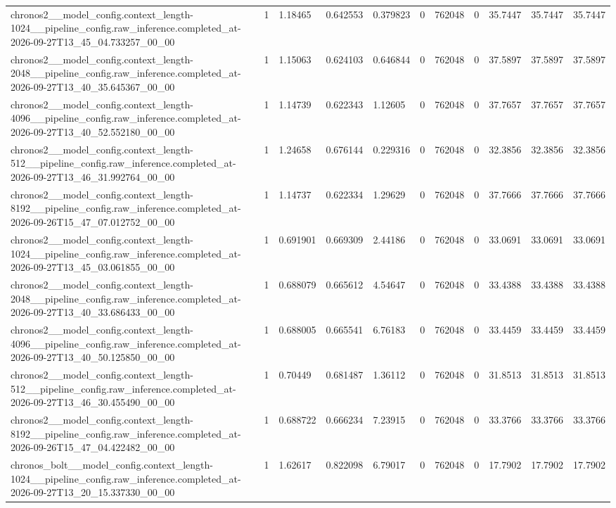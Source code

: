 \begin{tabular}{lllllllllll}
chronos2\_\_model\_config.context\_length-1024\_\_pipeline\_config.raw\_inference.completed\_at-2026-09-27T13\_45\_04.733257\_00\_00 & 1 & 1.18465 & 0.642553 & 0.379823 & 0 & 762048 & 0 & 35.7447 & 35.7447 & 35.7447 \\
chronos2\_\_model\_config.context\_length-2048\_\_pipeline\_config.raw\_inference.completed\_at-2026-09-27T13\_40\_35.645367\_00\_00 & 1 & 1.15063 & 0.624103 & 0.646844 & 0 & 762048 & 0 & 37.5897 & 37.5897 & 37.5897 \\
chronos2\_\_model\_config.context\_length-4096\_\_pipeline\_config.raw\_inference.completed\_at-2026-09-27T13\_40\_52.552180\_00\_00 & 1 & 1.14739 & 0.622343 & 1.12605 & 0 & 762048 & 0 & 37.7657 & 37.7657 & 37.7657 \\
chronos2\_\_model\_config.context\_length-512\_\_pipeline\_config.raw\_inference.completed\_at-2026-09-27T13\_46\_31.992764\_00\_00 & 1 & 1.24658 & 0.676144 & 0.229316 & 0 & 762048 & 0 & 32.3856 & 32.3856 & 32.3856 \\
chronos2\_\_model\_config.context\_length-8192\_\_pipeline\_config.raw\_inference.completed\_at-2026-09-26T15\_47\_07.012752\_00\_00 & 1 & 1.14737 & 0.622334 & 1.29629 & 0 & 762048 & 0 & 37.7666 & 37.7666 & 37.7666 \\
chronos2\_\_model\_config.context\_length-1024\_\_pipeline\_config.raw\_inference.completed\_at-2026-09-27T13\_45\_03.061855\_00\_00 & 1 & 0.691901 & 0.669309 & 2.44186 & 0 & 762048 & 0 & 33.0691 & 33.0691 & 33.0691 \\
chronos2\_\_model\_config.context\_length-2048\_\_pipeline\_config.raw\_inference.completed\_at-2026-09-27T13\_40\_33.686433\_00\_00 & 1 & 0.688079 & 0.665612 & 4.54647 & 0 & 762048 & 0 & 33.4388 & 33.4388 & 33.4388 \\
chronos2\_\_model\_config.context\_length-4096\_\_pipeline\_config.raw\_inference.completed\_at-2026-09-27T13\_40\_50.125850\_00\_00 & 1 & 0.688005 & 0.665541 & 6.76183 & 0 & 762048 & 0 & 33.4459 & 33.4459 & 33.4459 \\
chronos2\_\_model\_config.context\_length-512\_\_pipeline\_config.raw\_inference.completed\_at-2026-09-27T13\_46\_30.455490\_00\_00 & 1 & 0.70449 & 0.681487 & 1.36112 & 0 & 762048 & 0 & 31.8513 & 31.8513 & 31.8513 \\
chronos2\_\_model\_config.context\_length-8192\_\_pipeline\_config.raw\_inference.completed\_at-2026-09-26T15\_47\_04.422482\_00\_00 & 1 & 0.688722 & 0.666234 & 7.23915 & 0 & 762048 & 0 & 33.3766 & 33.3766 & 33.3766 \\
chronos\_bolt\_\_model\_config.context\_length-1024\_\_pipeline\_config.raw\_inference.completed\_at-2026-09-27T13\_20\_15.337330\_00\_00 & 1 & 1.62617 & 0.822098 & 6.79017 & 0 & 762048 & 0 & 17.7902 & 17.7902 & 17.7902 \\

\end{tabular}
